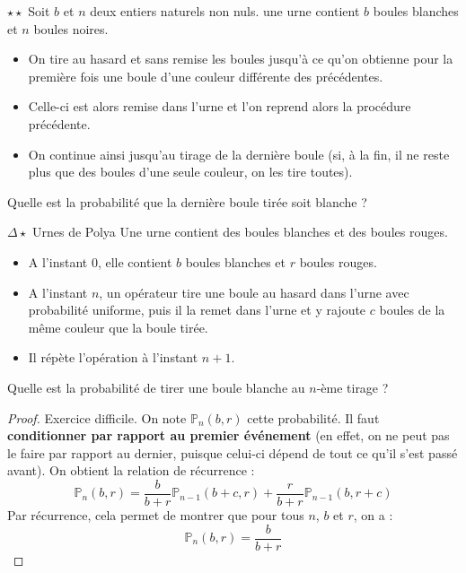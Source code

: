 \documentclass[french,a4paper]{article}
\renewcommand{\P}{\mathbb{P}}
\theoremstyle{plain}
\theoremstyle{definition}
\theoremstyle{remark}
\begin{document}
\begin{ex}{$\star\star$}
	Soit $b$ et $n$ deux entiers naturels non nuls. une urne contient $b$ boules blanches et $n$ boules noires.
	\begin{itemize}
		\item On tire au hasard et sans remise les boules jusqu'à ce qu'on obtienne pour la première fois une boule d'une couleur différente des précédentes.
		\item Celle-ci est alors remise dans l'urne et l'on reprend alors la procédure précédente.
		\item On continue ainsi jusqu'au tirage de la dernière boule (si, à la fin, il ne reste plus que des boules d'une seule couleur, on les tire toutes).
	\end{itemize}
	Quelle est la probabilité que la dernière boule tirée soit blanche ?
\end{ex}

\begin{ex}{$\Delta\star$ Urnes de Polya} Une urne contient des boules blanches et des boules rouges. 
	\begin{itemize}
		\item A l'instant $0$, elle contient $b$ boules blanches et $r$ boules rouges.
		\item A l'instant $n$, un opérateur tire une boule au hasard dans l'urne avec probabilité uniforme, puis il la remet dans l'urne et y rajoute $c$ boules de la même couleur que la boule tirée.
		\item Il répète l'opération à l'instant $n+1$.
	\end{itemize}Quelle est la probabilité de tirer une boule blanche au $n$-ème tirage ?
\end{ex}
\begin{proof}
	Exercice difficile. On note $\P_n(b,r)$ cette probabilité. Il faut \textbf{conditionner par rapport au premier événement} (en effet, on ne peut pas le faire par rapport au dernier, puisque celui-ci dépend de tout ce qu'il s'est passé avant). On obtient la relation de récurrence : $$\P_n(b,r)=\frac{b}{b+r}\P_{n-1}(b+c,r)+\frac{r}{b+r}\P_{n-1}(b,r+c)$$ Par récurrence, cela permet de montrer que pour tous $n$, $b$ et $r$, on a : $$\P_n(b,r)=\frac{b}{b+r}$$
\end{proof}
\end{document}
